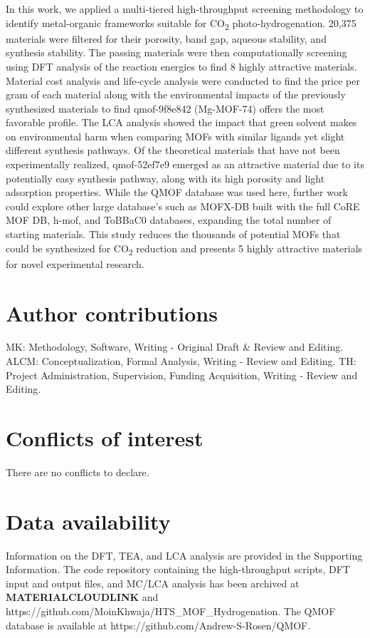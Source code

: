 \documentclass[twoside,twocolumn,9pt]{article}
\begin{document}
In this work, we applied a multi-tiered high-throughput screening methodology to identify metal-organic frameworks suitable for CO\textsubscript{2} photo-hydrogenation. 20,375 materials were filtered for their porosity, band gap, aqueous stability, and synthesis stability. The passing materials were then computationally screening using DFT analysis of the reaction energies to find 8 highly attractive materials. Material cost analysis and life-cycle analysis were conducted to find the price per gram of each material along with the environmental impacts of the previously synthesized materials to find qmof-9f8e842 (Mg-MOF-74) offers the most favorable profile. The LCA analysis showed the impact that green solvent makes on environmental harm when comparing MOFs with similar ligands yet slight different synthesis pathways. Of the theoretical materials that have not been experimentally realized, qmof-52ef7e9 emerged as an attractive material due to its potentially easy synthesis pathway, along with its high porosity and light adsorption properties. While the QMOF database was used here, further work could explore other large database's such as MOFX-DB\cite{bobbitt_mofx-db_2023} built with the full CoRE MOF DB\cite{chung_advances_2019}, h-mof\cite{wilmer_large-scale_2012}, and ToBBaC0\cite{colon_topologically_2017} databases, expanding the total number of starting materials. This study reduces the thousands of potential MOFs that could be synthesized for CO\textsubscript{2} reduction and presents 5 highly attractive materials for novel experimental research. 

\section*{Author contributions}
MK: Methodology, Software, Writing - Original Draft \& Review and Editing. ALCM: Conceptualization, Formal Analysis, Writing - Review and Editing. TH: Project Administration, Supervision, Funding Acquisition, Writing - Review and Editing.      

\section*{Conflicts of interest}
There are no conflicts to declare.

\section*{Data availability}
Information on the DFT, TEA, and LCA analysis are provided in the Supporting Information.
The code repository containing the high-throughput scripts, DFT input and output files, and MC/LCA analysis has been archived at \textbf{MATERIALCLOUDLINK} and https://github.com/MoinKhwaja/HTS\_MOF\_Hydrogenation. The QMOF database is available at https://github.com/Andrew-S-Rosen/QMOF.
\end{document}
